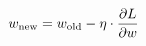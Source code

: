 \documentclass[preview]{standalone}
\begin{document}
\begin{align*}
\special{dvisvgm:raw <g id='unique000'>}w_{\text{new}} = w_{\text{old}} - \eta \cdot \frac{\partial L}{\partial w}\special{dvisvgm:raw </g>}
\end{align*}
\end{document}

